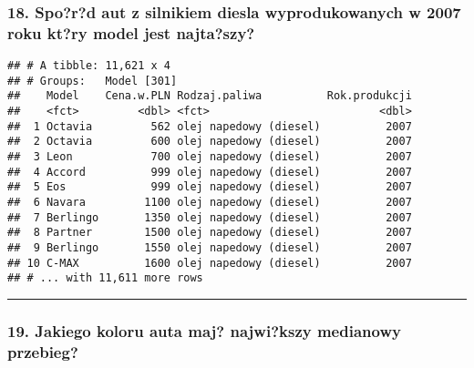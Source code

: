 \documentclass[]{article}
\newenvironment{Shaded}{\begin{snugshade}}{\end{snugshade}}
\newcommand{\KeywordTok}[1]{\textcolor[rgb]{0.13,0.29,0.53}{\textbf{#1}}}
\newcommand{\DecValTok}[1]{\textcolor[rgb]{0.00,0.00,0.81}{#1}}
\newcommand{\StringTok}[1]{\textcolor[rgb]{0.31,0.60,0.02}{#1}}
\newcommand{\OperatorTok}[1]{\textcolor[rgb]{0.81,0.36,0.00}{\textbf{#1}}}
\newcommand{\NormalTok}[1]{#1}
\begin{document}
\subsubsection{18. Spo?r?d aut z silnikiem diesla wyprodukowanych w 2007
roku kt?ry model jest
najta?szy?}\label{spord-aut-z-silnikiem-diesla-wyprodukowanych-w-2007-roku-ktry-model-jest-najtaszy}

\begin{Shaded}
\end{Shaded}

\begin{verbatim}
## # A tibble: 11,621 x 4
## # Groups:   Model [301]
##    Model    Cena.w.PLN Rodzaj.paliwa          Rok.produkcji
##    <fct>         <dbl> <fct>                          <dbl>
##  1 Octavia         562 olej napedowy (diesel)          2007
##  2 Octavia         600 olej napedowy (diesel)          2007
##  3 Leon            700 olej napedowy (diesel)          2007
##  4 Accord          999 olej napedowy (diesel)          2007
##  5 Eos             999 olej napedowy (diesel)          2007
##  6 Navara         1100 olej napedowy (diesel)          2007
##  7 Berlingo       1350 olej napedowy (diesel)          2007
##  8 Partner        1500 olej napedowy (diesel)          2007
##  9 Berlingo       1550 olej napedowy (diesel)          2007
## 10 C-MAX          1600 olej napedowy (diesel)          2007
## # ... with 11,611 more rows
\end{verbatim}

\begin{center}\rule{0.5\linewidth}{\linethickness}\end{center}

\subsubsection{19. Jakiego koloru auta maj? najwi?kszy medianowy
przebieg?}\label{jakiego-koloru-auta-maj-najwikszy-medianowy-przebieg}
\end{document}
